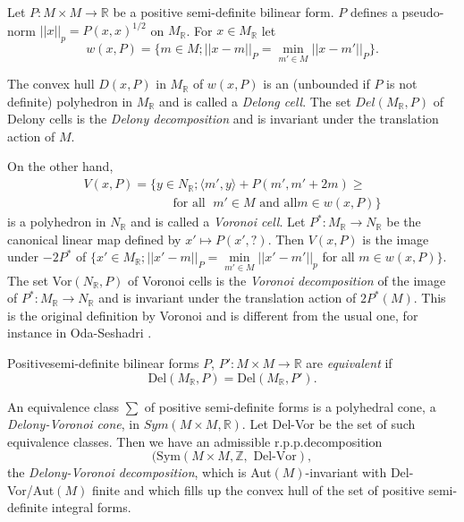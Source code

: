 Let $P : M \times M \to \mathbb{R}$ be a positive semi-definite  bilinear
form. $P$ defines a pseudo-norm $|| x ||_p = P(x, x)^{1/2}$ on
$M_{\mathbb{R}}$. For $x\in M_\mathbb{R}$ let 
$$
w(x, P) = \{ m \in M ; || x - m ||_P = \min_{m' \in M} || x - m' ||_P
\}. 
$$

\noindent
The convex hull $D(x, P)$ in $M_{\mathbb{R}} $ of $w (x, P)$ is an
(unbounded if $P$ is not definite) polyhedron in $M_{\mathbb{R}}$ and
is called a \textit{Delong cell}. The set $Del(M_{\mathbb{R}}, P)$ of
Delony cells is the \textit{Delony decomposition} and is invariant
under the translation action of $M$.  

On the other hand,
\begin{gather*}
V (x, P) = \{ y \in N_\mathbb{R} ; \langle m' , y \rangle + P(m', m' +
2m) \ge \\ 
\hspace{3cm}
\text{for all } \; m' \in M \text{ and  all}  m \in w (x, P) \} 
\end{gather*}
is a polyhedron in $N_\mathbb{R}$ and is called a \textit{Voronoi
  cell}. Let  $P^* : M_\mathbb{R} \to N_\mathbb{R}$ be the canonical
linear map defined by $x' \mapsto P(x', ?)$. Then $V (x, P)$ is the
image under $-2P^*$ of $\{ x' \in M_\mathbb{R} ; || x' - m ||_P =
\min\limits_{m' \in M} || x' - m' ||_p$ for all $m \in w (x, P) \}$.
The set Vor$(N_\mathbb{R}, P)$ of Voronoi cells is the \textit{
  Voronoi decomposition} of the image of $P^* : M_\mathbb{R } \to
N_\mathbb{R}$ and is invariant under the translation action of $2P^*
(M)$. This is the original definition by Voronoi and is different from
the usual one, for  instance in Oda-Seshadri \cite{keyOS}. 

\begin{defi*}
Positive\pageoriginale semi-definite bilinear forms $P$, $P' : M \times M
\to \mathbb{R}$ are \textit{equivalent} if   
$$
\text{Del}(M_\mathbb{R}, P) = \text{Del} (M_\mathbb{R}, P'). 
$$
\end{defi*}

An equivalence class $\sum$ of positive semi-definite forms is a
polyhedral cone, a \textit{Delony-Voronoi cone}, in $Sym (M \times M,
\mathbb{R})$. Let Del-Vor be the set of such equivalence classes. Then
we have an admissible r.p.p.decomposition 
$$
(\text{Sym}(M \times M, \mathbb{Z}, \text { Del-Vor}),
$$
the \textit{Delony-Voronoi decomposition}, which is
Aut$(M)$-invariant with Del-Vor/Aut$(M)$ finite and which fills up the
convex hull of the set of positive semi-definite integral forms.  

